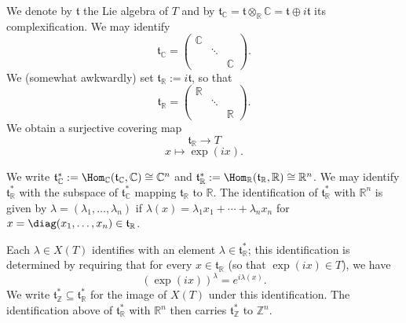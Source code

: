 \documentclass[reqno]{amsart} 
\begin{document}
We denote by $\mathfrak{t}$ the Lie algebra of $T$ and by $\mathfrak{t}_{\mathbb{C}} = \mathfrak{t}\otimes_{\mathbb{R}} \mathbb{C} = \mathfrak{t} \oplus i \mathfrak{t}$ its complexification.  We may identify
\begin{equation*}
  \mathfrak{t}_{\mathbb{C}} =
  \begin{pmatrix}
    \mathbb{C}  &  &  \\
    & \ddots  &  \\
    & & \mathbb{C}
  \end{pmatrix}
.
\end{equation*}
We (somewhat awkwardly) set $\mathfrak{t}_{\mathbb{R}} := i \mathfrak{t}$, so that
\begin{equation}\label{eq:describe-t-R}
  \mathfrak{t}_{\mathbb{R}} =
  \begin{pmatrix}
    \mathbb{R}  &  &  \\
    & \ddots  &  \\
    & & \mathbb{R}
  \end{pmatrix}
.
\end{equation}
We obtain a surjective covering map
\begin{equation*}
  \mathfrak{t}_{\mathbb{R}} \rightarrow T
\end{equation*}
\begin{equation*}
  x \mapsto \exp(i x).
\end{equation*}

We write $\mathfrak{t}_{\mathbb{C}}^* := \Hom_{\mathbb{C}}(\mathfrak{t}_{\mathbb{C}},\mathbb{C}) \cong \mathbb{C}^n$ and $\mathfrak{t}_{\mathbb{R}}^* := \Hom_{\mathbb{R}}(\mathfrak{t}_{\mathbb{R}},\mathbb{R}) \cong \mathbb{R}^n$.  We may identify $\mathfrak{t}_{\mathbb{R}}^*$ with the subspace of $\mathfrak{t}_{\mathbb{C}}^*$ mapping $\mathfrak{t}_{\mathbb{R}}$ to $\mathbb{R}$.  The identification of $\mathfrak{t}_{\mathbb{R}}^*$ with $\mathbb{R}^n$ is given by $\lambda = (\lambda_1,\dotsc,\lambda_n)$ if $\lambda(x) = \lambda_1 x_1 + \dotsb + \lambda_n x_n$ for $x = \diag(x_1,\dotsc,x_n) \in \mathfrak{t}_{\mathbb{R}}$.

Each $\lambda \in X(T)$ identifies with an element $\lambda \in \mathfrak{t}_{\mathbb{R}}^*$; this identification is determined by requiring that for every $x \in \mathfrak{t}_{\mathbb{R}}$ (so that $\exp(i x) \in T$), we have
\begin{equation*}
  (\exp(i x))^{\lambda} = e^{i \lambda(x)}.
\end{equation*}
We write $\mathfrak{t}_{\mathbb{Z}}^* \subseteq \mathfrak{t}_{\mathbb{R}}^*$ for the image of $X(T)$ under this identification.  The identification above of $\mathfrak{t}_{\mathbb{R}}^*$ with $\mathbb{R}^n$ then carries $\mathfrak{t}_{\mathbb{Z}}^*$ to $\mathbb{Z}^n$.
\end{document}
